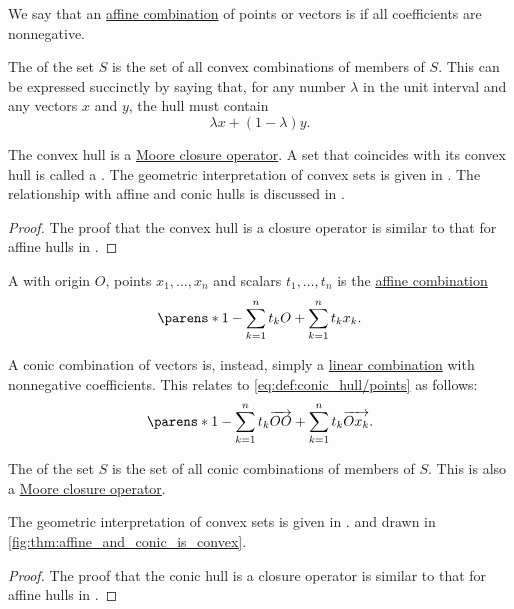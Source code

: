\begin{definition}\label{def:convex_hull}\mimprovised
  We say that an \hyperref[rem:affine_combinations]{affine combination} of points or vectors is  if all coefficients are nonnegative.

  The  of the set \( S \) is the set of all convex combinations of members of \( S \). This can be expressed succinctly by saying that, for any number \( \lambda \) in the unit interval and any vectors \( x \) and \( y \), the hull must contain
  \begin{equation}\label{eq:def:convex_hull/combination}
    \lambda x + (1 - \lambda) y.
  \end{equation}

  The convex hull is a \hyperref[def:moore_closure_operator]{Moore closure operator}. A set that coincides with its convex hull is called a . The geometric interpretation of convex sets is given in . The relationship with affine and conic hulls is discussed in .
\end{definition}
\begin{proof}
  The proof that the convex hull is a closure operator is similar to that for affine hulls in .
\end{proof}

\begin{definition}\label{def:conic_hull}\mimprovised
  A  with origin \( O \), points \( x_1, \ldots, x_n \) and  scalars \( t_1, \ldots, t_n \) is the \hyperref[rem:affine_combinations]{affine combination}
  \begin{equation}\label{eq:def:conic_hull/points}
    \parens*{ 1 - \sum_{k=1}^n t_k } O + \sum_{k=1}^n t_k x_k.
  \end{equation}

  A conic combination of vectors is, instead, simply a \hyperref[rem:linear_combinations]{linear combination} with nonnegative coefficients. This relates to \eqref{eq:def:conic_hull/points} as follows:
  \begin{equation*}
    \parens*{ 1 - \sum_{k=1}^n t_k } \vect{OO} + \sum_{k=1}^n t_k \vect{O x_k}.
  \end{equation*}

  The  of the set \( S \) is the set of all conic combinations of members of \( S \). This is also a \hyperref[def:moore_closure_operator]{Moore closure operator}.

  The geometric interpretation of convex sets is given in . and drawn in \cref{fig:thm:affine_and_conic_is_convex}.
\end{definition}
\begin{proof}
  The proof that the conic hull is a closure operator is similar to that for affine hulls in .
\end{proof}

